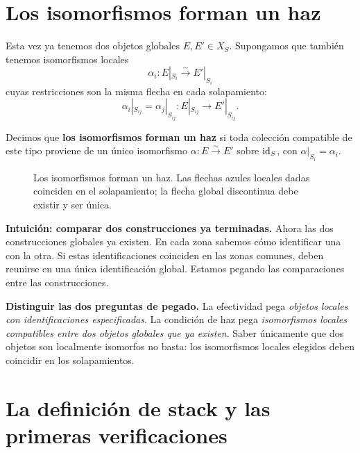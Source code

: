 \documentclass[12pt,openany]{memoir}
\begin{document}
\section{Los isomorfismos forman un haz}
\label{sec:isom-sheaf}

Esta vez ya tenemos dos objetos globales \(E,E'\in X_S\). Supongamos
que también tenemos isomorfismos locales
\[
 \alpha_i:E|_{S_i}\xrightarrow{\sim}E'|_{S_i}
\]
cuyas restricciones son la misma flecha en cada solapamiento:
\[
 \alpha_i|_{S_{ij}}=\alpha_j|_{S_{ij}}:
 E|_{S_{ij}}\longrightarrow E'|_{S_{ij}}.
\]

\begin{Def}
Decimos que \textbf{los isomorfismos forman un haz} si toda colección
compatible de este tipo proviene de un único isomorfismo
\(\alpha:E\xrightarrow{\sim}E'\) sobre \(\operatorname{id}_S\), con
\(\alpha|_{S_i}=\alpha_i\).
\end{Def}

\begin{figure}[htbp]
\centering
\TalkISDiagram
\caption{Los isomorfismos forman un haz. Las flechas azules locales dadas
coinciden en el solapamiento; la flecha global discontinua debe existir
y ser única.}
\label{fig:isom-sheaf}
\end{figure}

\begin{ptcb}
\textbf{Intuición: comparar dos construcciones ya terminadas.}
Ahora las dos construcciones globales ya existen. En cada zona sabemos
cómo identificar una con la otra. Si estas identificaciones coinciden en
las zonas comunes, deben reunirse en una única identificación global.
Estamos pegando las comparaciones entre las construcciones.
\end{ptcb}

\begin{ptcb}
\textbf{Distinguir las dos preguntas de pegado.}
La efectividad pega \emph{objetos locales con identificaciones especificadas}.
La condición de haz pega \emph{isomorfismos locales compatibles entre dos
objetos globales que ya existen}. Saber únicamente que dos objetos son
localmente isomorfos no basta: los isomorfismos locales elegidos deben
coincidir en los solapamientos.
\end{ptcb}

\section{La definición de stack y las primeras verificaciones}
\label{sec:stack}
\end{document}
